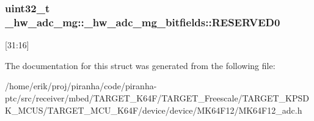 \subsubsection[{\texorpdfstring{R\+E\+S\+E\+R\+V\+E\+D0}{RESERVED0}}]{\setlength{\rightskip}{0pt plus 5cm}uint32\+\_\+t \+\_\+hw\+\_\+adc\+\_\+mg\+::\+\_\+hw\+\_\+adc\+\_\+mg\+\_\+bitfields\+::\+R\+E\+S\+E\+R\+V\+E\+D0}\hypertarget{struct__hw__adc__mg_1_1__hw__adc__mg__bitfields_a52ed7fff224bb09a9d9b17a04bb0e997}{}\label{struct__hw__adc__mg_1_1__hw__adc__mg__bitfields_a52ed7fff224bb09a9d9b17a04bb0e997}
\mbox{[}31\+:16\mbox{]} 

The documentation for this struct was generated from the following file\+:\begin{DoxyCompactItemize}
\item 
/home/erik/proj/piranha/code/piranha-\/ptc/src/receiver/mbed/\+T\+A\+R\+G\+E\+T\+\_\+\+K64\+F/\+T\+A\+R\+G\+E\+T\+\_\+\+Freescale/\+T\+A\+R\+G\+E\+T\+\_\+\+K\+P\+S\+D\+K\+\_\+\+M\+C\+U\+S/\+T\+A\+R\+G\+E\+T\+\_\+\+M\+C\+U\+\_\+\+K64\+F/device/device/\+M\+K64\+F12/M\+K64\+F12\+\_\+adc.\+h\end{DoxyCompactItemize}
